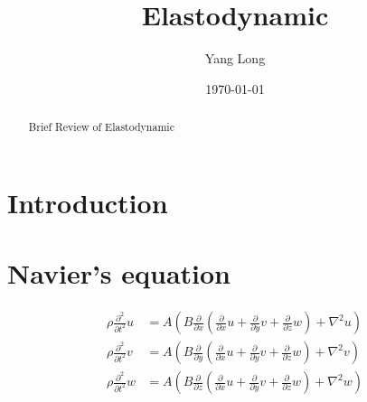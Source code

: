 \documentclass[%
 reprint,
 amsmath,amssymb,
 aps,
rmp,
]{revtex4-1}
\begin{document}

\title{Elastodynamic}

\author{Yang Long}%

\date{\today}

\begin{abstract}
Brief Review of Elastodynamic
\end{abstract}

\maketitle

\section{Introduction}

\section{Navier's equation}
\begin{widetext}
\begin{equation}
\begin{aligned}
\rho \frac{\partial^2}{\partial t^2}u &= A\left(B\frac{\partial}{\partial x}\left(\frac{\partial}{\partial x}u + \frac{\partial}{\partial y}v + \frac{\partial}{\partial z}w\right) + \nabla^2 u\right) \\
\rho \frac{\partial^2}{\partial t^2}v &= A\left(B\frac{\partial}{\partial y}\left(\frac{\partial}{\partial x}u + \frac{\partial}{\partial y}v + \frac{\partial}{\partial z}w\right) + \nabla^2 v\right) \\ 
\rho \frac{\partial^2}{\partial t^2}w &= A\left(B\frac{\partial}{\partial z}\left(\frac{\partial}{\partial x}u + \frac{\partial}{\partial y}v + \frac{\partial}{\partial z}w\right) + \nabla^2 w\right) 
\end{aligned}
\end{equation}
\end{widetext}
\end{document}
